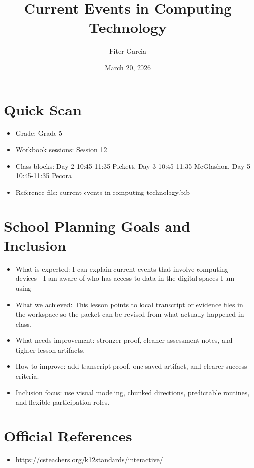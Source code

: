 \documentclass[11pt]{article}
\title{Current Events in Computing Technology}
\author{Piter Garcia}
\date{March 20, 2026}
\begin{document}
\maketitle
\section*{Quick Scan}
\begin{itemize}[leftmargin=*]
\item Grade: Grade 5
\item Workbook sessions: Session 12
\item Class blocks: Day 2 10:45-11:35 Pickett, Day 3 10:45-11:35 McGlashon, Day 5 10:45-11:35 Pecora
\item Reference file: current-events-in-computing-technology.bib
\end{itemize}
\section*{School Planning Goals and Inclusion}
\begin{itemize}[leftmargin=*]
\item What is expected: I can explain current events that involve computing devices | I am aware of who has access to data in the digital spaces I am using
\item What we achieved: This lesson points to local transcript or evidence files in the workspace so the packet can be revised from what actually happened in class.
\item What needs improvement: stronger proof, cleaner assessment notes, and tighter lesson artifacts.
\item How to improve: add transcript proof, one saved artifact, and clearer success criteria.
\item Inclusion focus: use visual modeling, chunked directions, predictable routines, and flexible participation roles.
\end{itemize}
\section*{Official References}
\begin{itemize}[leftmargin=*]
\item \url{https://csteachers.org/k12standards/interactive/}

\end{itemize}
\end{document}
